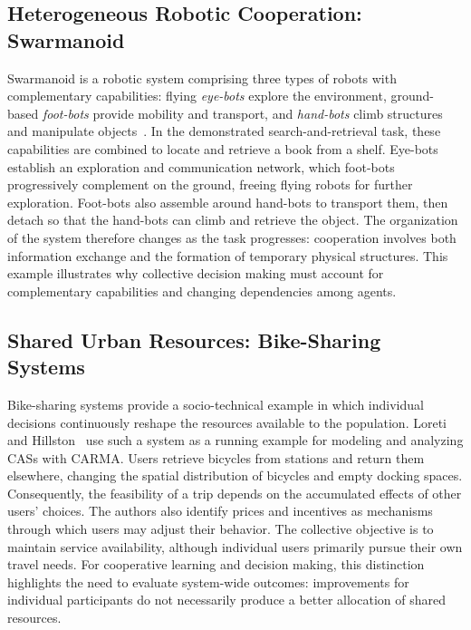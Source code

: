 \subsection{Heterogeneous Robotic Cooperation: Swarmanoid}
Swarmanoid is a robotic system comprising three types of robots 
 with complementary capabilities: flying \emph{eye-bots} explore the environment,
 ground-based \emph{foot-bots} provide mobility and transport,
 and \emph{hand-bots} climb structures and manipulate objects~\cite{DBLP:journals/ram/Dorigo13}.
%
In the demonstrated search-and-retrieval task,
 these capabilities are combined to locate and retrieve a book from a shelf.
%
Eye-bots establish an exploration and communication network,
 which foot-bots progressively complement on the ground,
 freeing flying robots for further exploration.
%
Foot-bots also assemble around hand-bots to transport them,
 then detach so that the hand-bots can climb and retrieve the object.
%
The organization of the system therefore changes as the task progresses:
 cooperation involves both information exchange 
 and the formation of temporary physical structures.
%
This example illustrates why collective decision making must account 
 for complementary capabilities and changing dependencies among agents.

\subsection{Shared Urban Resources: Bike-Sharing Systems}
Bike-sharing systems provide a socio-technical example 
 in which individual decisions continuously reshape the resources available
 to the population.
%
Loreti and Hillston~\cite{DBLP:conf/sfm/LoretiH16} use such a system as a running example
 for modeling and analyzing CASs with CARMA.
%
Users retrieve bicycles from stations and return them elsewhere,
 changing the spatial distribution of bicycles and empty docking spaces.
%
Consequently, 
 the feasibility of a trip depends on the accumulated effects of other users' choices.
%
The authors also identify prices and incentives as mechanisms
 through which users may adjust their behavior.
%
The collective objective is to maintain service availability,
 although individual users primarily pursue their own travel needs.
%
For cooperative learning and decision making,
 this distinction highlights the need to evaluate system-wide outcomes:
 improvements for individual participants do not necessarily produce
 a better allocation of shared resources.

